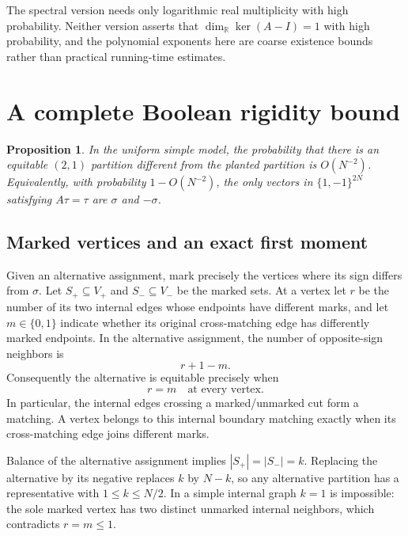 \documentclass[11pt]{article}
\newtheorem{proposition}[theorem]{Proposition}
\theoremstyle{remark}
\newcommand{\1}{\mathbf 1}
\begin{document}
The spectral version needs only logarithmic real multiplicity with
high probability. Neither version asserts that
$\dim_{\mathbb R}\ker(A-I)=1$ with high probability, and the polynomial
exponents here are coarse existence bounds rather than practical
running-time estimates.

\appendix
\section{A complete Boolean rigidity bound}\label{app:rigidity}

\begin{proposition}\label{prop:rigidity}
In the uniform simple model, the probability that there is an equitable
$(2,1)$ partition different from the planted partition is $O(N^{-2})$.
Equivalently, with probability $1-O(N^{-2})$, the only vectors in
$\{1,-1\}^{2N}$ satisfying $A\tau=\tau$ are $\sigma$ and $-\sigma$.
\end{proposition}

\subsection{Marked vertices and an exact first moment}

Given an alternative assignment, mark precisely the vertices where its
sign differs from $\sigma$. Let $S_+\subseteq V_+$ and
$S_-\subseteq V_-$ be the marked sets. At a vertex let $r$ be the
number of its two internal edges whose endpoints have different marks,
and let $m\in\{0,1\}$ indicate whether its original cross-matching
edge has differently marked endpoints. In the alternative assignment,
the number of opposite-sign neighbors is
\[
 r+1-m.
\]
Consequently the alternative is equitable precisely when
\begin{equation}\label{eq:r-m}
 r=m\quad\text{at every vertex}.
\end{equation}
In particular, the internal edges crossing a marked/unmarked cut form
a matching. A vertex belongs to this internal boundary matching exactly
when its cross-matching edge joins different marks.

Balance of the alternative assignment implies
$|S_+|=|S_-|=k$. Replacing the alternative by its negative replaces $k$
by $N-k$, so any alternative partition has a representative with
$1\leq k\leq N/2$. In a simple internal graph $k=1$ is impossible:
the sole marked vertex has two distinct unmarked internal neighbors,
which contradicts $r=m\leq1$.
\end{document}
